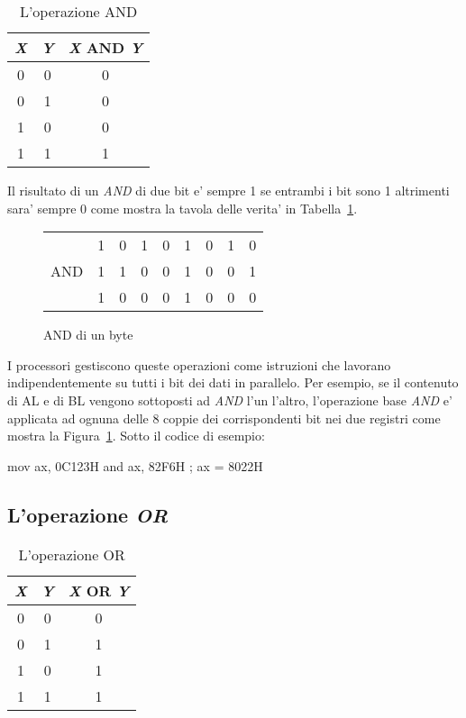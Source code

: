 \begin{table}[t]
\centering
\begin{tabular}{|c|c|c|}
\hline
\emph{X} & \emph{Y} & \emph{X} AND \emph{Y} \\
\hline \hline
0 & 0 & 0 \\
0 & 1 & 0 \\
1 & 0 & 0 \\
1 & 1 & 1 \\
\hline
\end{tabular}
\caption{L'operazione AND \label{tab:and} }
\end{table}

Il risultato di un \emph{AND} di due bit e' sempre 1 se entrambi i bit sono 1
altrimenti sara' sempre 0 come mostra la tavola delle verita' in Tabella~\ref{tab:and}.

\begin{figure}[t]
\centering
\begin{tabular}{rcccccccc}
    & 1 & 0 & 1 & 0 & 1 & 0 & 1 & 0 \\
AND & 1 & 1 & 0 & 0 & 1 & 0 & 0 & 1 \\
\hline
    & 1 & 0 & 0 & 0 & 1 & 0 & 0 & 0
\end{tabular}
\caption{AND di un byte \label{fig:and}}
\end{figure}

I processori gestiscono queste operazioni come istruzioni che lavorano
indipendentemente su tutti i bit dei dati in parallelo. Per esempio, se
il contenuto di {\code AL} e di {\code BL} vengono sottoposti ad \emph{AND} 
l'un l'altro, l'operazione base \emph{AND} e' applicata ad ognuna delle
8 coppie dei corrispondenti bit nei due registri come mostra la 
Figura~\ref{fig:and}. Sotto il codice di esempio:
\begin{AsmCodeListing}[frame=none]
      mov    ax, 0C123H
      and    ax, 82F6H          ; ax = 8022H
\end{AsmCodeListing}

\subsection{L'operazione \emph{OR}}

\begin{table}[t]
\centering
\begin{tabular}{|c|c|c|}
\hline
\emph{X} & \emph{Y} & \emph{X} OR \emph{Y} \\
\hline \hline
0 & 0 & 0 \\
0 & 1 & 1 \\
1 & 0 & 1 \\
1 & 1 & 1 \\
\hline
\end{tabular}
\caption{L'operazione OR\label{tab:or} }
\end{table}

